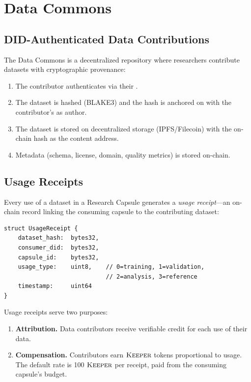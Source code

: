 \section{Data Commons}

\label{sec:commons}

\subsection{DID-Authenticated Data Contributions}

The \Zoo{} Data Commons \cite{zoo-data-commons} is a decentralized repository where researchers contribute datasets with cryptographic provenance:

\begin{enumerate}
    \item The contributor authenticates via their \IChain{} \DID{}.
    \item The dataset is hashed (BLAKE3) and the hash is anchored on \IChain{} with the contributor's \DID{} as author.
    \item The dataset is stored on decentralized storage (IPFS/Filecoin) with the on-chain hash as the content address.
    \item Metadata (schema, license, domain, quality metrics) is stored on-chain.
\end{enumerate}

\subsection{Usage Receipts}

Every use of a dataset in a Research Capsule generates a \emph{usage receipt}---an on-chain record linking the consuming capsule to the contributing dataset:

\begin{verbatim}
struct UsageReceipt {
    dataset_hash:  bytes32,
    consumer_did:  bytes32,
    capsule_id:    bytes32,
    usage_type:    uint8,    // 0=training, 1=validation,
                             // 2=analysis, 3=reference
    timestamp:     uint64
}
\end{verbatim}

Usage receipts serve two purposes:
\begin{enumerate}
    \item \textbf{Attribution.} Data contributors receive verifiable credit for each use of their data.
    \item \textbf{Compensation.} Contributors earn $\textsc{Keeper}$ tokens proportional to usage. The default rate is 100 $\textsc{Keeper}$ per receipt, paid from the consuming capsule's budget.
\end{enumerate}

